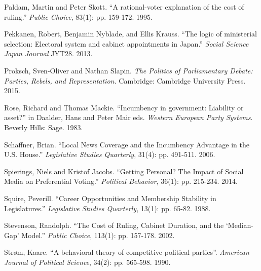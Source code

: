 \documentclass[letter,12pt]{article}
\begin{document}
\begin{hangparas}{.25in}{1}
Paldam, Martin and Peter Skott. ``A rational-voter explanation of the cost of ruling.'' \textit{Public Choice}, 83(1): pp. 159-172. 1995.

Pekkanen, Robert, Benjamin Nyblade, and Ellis Krauss. ``The logic of ministerial selection: Electoral system and cabinet appointments in Japan.'' \textit{Social Science Japan Journal} JYT28. 2013.

Proksch, Sven-Oliver and Nathan Slapin. \textit{The Politics of Parliamentary Debate: Parties, Rebels, and Representation.} Cambridge: Cambridge University Press. 2015.

Rose, Richard and Thomas Mackie. ``Incumbency in government: Liability or asset?'' in Daalder, Hans and Peter Mair eds. \textit{Western European Party Systems}. Beverly Hills: Sage. 1983.

Schaffner, Brian. ``Local News Coverage and the Incumbency Advantage in the U.S. House.'' \textit{Legislative Studies Quarterly}, 31(4): pp. 491-511. 2006.

Spierings, Niels and Kristof Jacobs. ``Getting Personal? The Impact of Social Media on Preferential Voting.'' \textit{Political Behavior}, 36(1): pp. 215-234. 2014.

Squire, Peverill. ``Career Opportunities and Membership Stability in Legislatures.'' \textit{Legislative Studies Quarterly}, 13(1): pp. 65-82. 1988.

Stevenson, Randolph. ``The Cost of Ruling, Cabinet Duration, and the `Median-Gap' Model.'' \textit{Public Choice}, 113(1): pp. 157-178. 2002.

Str{\o}m, Kaare. ``A behavioral theory of competitive political parties''. \textit{American Journal of Political Science}, 34(2): pp. 565-598. 1990.
\end{hangparas}
\end{document}
